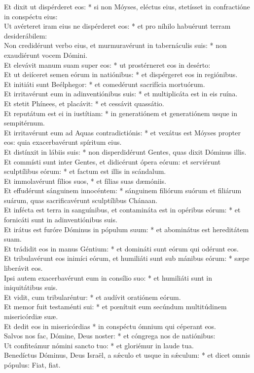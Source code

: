 {	Et dixit ut dispérderet eos: * si non Móyses, eléctus eius, stetísset in confractióne in conspéctu eius: \\
	Ut avérteret iram eius ne dispérderet eos: * et pro níhilo habuérunt terram desiderábilem: \\
	Non credidérunt verbo eius, et murmuravérunt in tabernáculis suis: * non exaudiérunt vocem Dómini. \\
	Et elevávit manum suam super eos: * ut prostérneret eos in desérto: \\
	Et ut deiíceret semen eórum in natiónibus: * et dispérgeret eos in regiónibus. \\
	Et initiáti sunt Beélphegor: * et comedérunt sacrifícia mortuórum. \\
	Et irritavérunt eum in adinventiónibus suis: * et multiplicáta est in eis ruína. \\
	Et stetit Phínees, et placávit: * et cessávit quassátio. \\
	Et reputátum est ei in iustítiam: * in generatiónem et generatiónem usque in sempitérnum. \\
	Et irritavérunt eum ad Aquas contradictiónis: * et vexátus est Móyses propter eos: quia exacerbavérunt spíritum eius. \\
	Et distínxit in lábiis suis: * non disperdidérunt Gentes, quas dixit Dóminus illis. \\
	Et commísti sunt inter Gentes, et didicérunt ópera eórum: et serviérunt sculptílibus eórum: * et factum est illis in scándalum. \\
	Et immolavérunt fílios suos, * et fílias suas dæmóniis. \\
	Et effudérunt sánguinem innocéntem: * sánguinem filiórum suórum et filiárum suárum, quas sacrificavérunt sculptílibus Chánaan. \\
	Et infécta est terra in sanguínibus, et contamináta est in opéribus eórum: * et fornicáti sunt in adinventiónibus suis. \\
	Et irátus est furóre Dóminus in pópulum suum: * et abominátus est hereditátem suam. \\
	Et trádidit eos in manus Géntium: * et domináti sunt eórum qui odérunt eos. \\
	Et tribulavérunt eos inimíci eórum, et humiliáti sunt sub mánibus eórum: * sæpe liberávit eos. \\
	Ipsi autem exacerbavérunt eum in consílio suo: * et humiliáti sunt in iniquitátibus suis. \\
	Et vidit, cum tribularéntur: * et audívit oratiónem eórum. \\
	Et memor fuit testaménti sui: * et pœnítuit eum secúndum multitúdinem misericórdiæ suæ. \\
	Et dedit eos in misericórdias * in conspéctu ómnium qui céperant eos. \\
	Salvos nos fac, Dómine, Deus noster: * et cóngrega nos de natiónibus: \\
	Ut confiteámur nómini sancto tuo: * et gloriémur in laude tua. \\
	Benedíctus Dóminus, Deus Israël, a sǽculo et usque in sǽculum: * et dicet omnis pópulus: Fiat, fiat. \\
}

